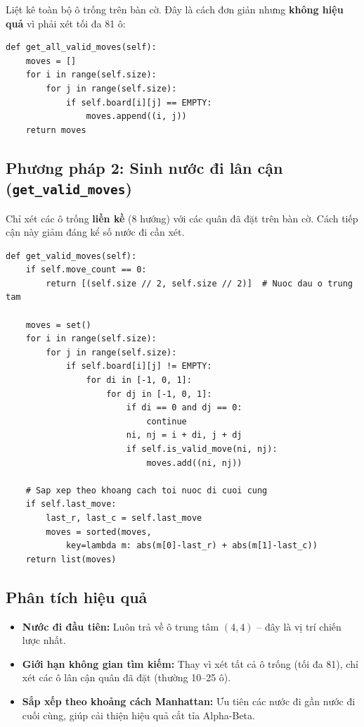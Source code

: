 \documentclass[12pt,a4paper]{article}
\begin{document}
Liệt kê toàn bộ ô trống trên bàn cờ. Đây là cách đơn giản nhưng \textbf{không hiệu quả} vì phải xét tối đa 81 ô:

\begin{lstlisting}[caption={Sinh tất cả nước đi hợp lệ}]
def get_all_valid_moves(self):
    moves = []
    for i in range(self.size):
        for j in range(self.size):
            if self.board[i][j] == EMPTY:
                moves.append((i, j))
    return moves
\end{lstlisting}

\subsection{Phương pháp 2: Sinh nước đi lân cận (\texttt{get\_valid\_moves})}

Chỉ xét các ô trống \textbf{liền kề} (8 hướng) với các quân đã đặt trên bàn cờ. Cách tiếp cận này giảm đáng kể số nước đi cần xét.

\begin{lstlisting}[caption={Sinh nước đi lân cận -- chiến lược tối ưu}]
def get_valid_moves(self):
    if self.move_count == 0:
        return [(self.size // 2, self.size // 2)]  # Nuoc dau o trung tam

    moves = set()
    for i in range(self.size):
        for j in range(self.size):
            if self.board[i][j] != EMPTY:
                for di in [-1, 0, 1]:
                    for dj in [-1, 0, 1]:
                        if di == 0 and dj == 0:
                            continue
                        ni, nj = i + di, j + dj
                        if self.is_valid_move(ni, nj):
                            moves.add((ni, nj))

    # Sap xep theo khoang cach toi nuoc di cuoi cung
    if self.last_move:
        last_r, last_c = self.last_move
        moves = sorted(moves,
            key=lambda m: abs(m[0]-last_r) + abs(m[1]-last_c))
    return list(moves)
\end{lstlisting}

\subsection{Phân tích hiệu quả}

\begin{itemize}
    \item \textbf{Nước đi đầu tiên:} Luôn trả về ô trung tâm $(4, 4)$ -- đây là vị trí chiến lược nhất.
    \item \textbf{Giới hạn không gian tìm kiếm:} Thay vì xét tất cả ô trống (tối đa 81), chỉ xét các ô lân cận quân đã đặt (thường 10--25 ô).
    \item \textbf{Sắp xếp theo khoảng cách Manhattan:} Ưu tiên các nước đi gần nước đi cuối cùng, giúp cải thiện hiệu quả cắt tỉa Alpha-Beta.
\end{itemize}
\end{document}

